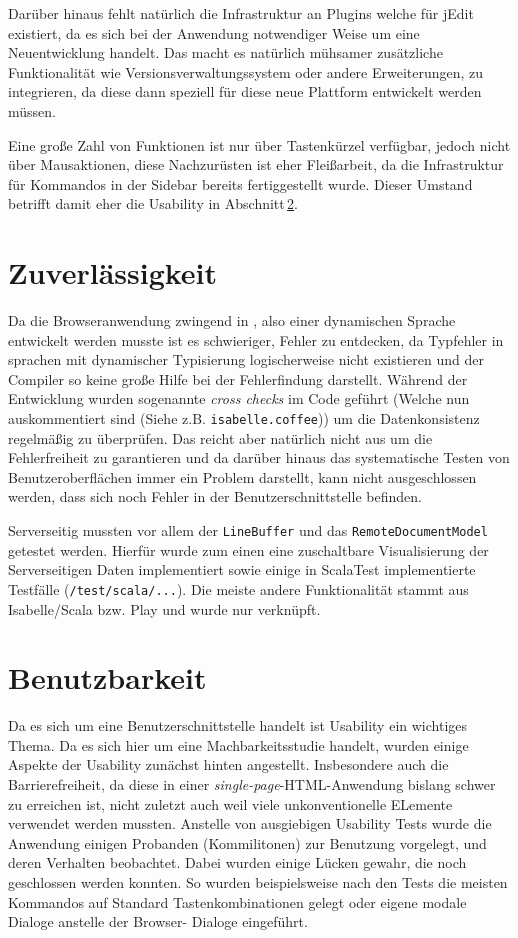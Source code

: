 Darüber hinaus fehlt natürlich die Infrastruktur an Plugins welche für jEdit existiert, da es sich
bei der Anwendung notwendiger Weise um eine Neuentwicklung handelt. Das macht es natürlich mühsamer
zusätzliche Funktionalität wie Versionsverwaltungssystem oder andere Erweiterungen, zu integrieren,
da diese dann speziell für diese neue Plattform entwickelt werden müssen.

Eine große Zahl von Funktionen ist nur über Tastenkürzel verfügbar, jedoch nicht über Mausaktionen,
diese Nachzurüsten ist eher Fleißarbeit, da die Infrastruktur für Kommandos in der Sidebar bereits
fertiggestellt wurde. Dieser Umstand betrifft damit eher die Usability in
Abschnitt\,\ref{sec:usability}.

\section{Zuverlässigkeit}

Da die Browseranwendung zwingend in , also einer dynamischen Sprache entwickelt werden
musste ist es schwieriger, Fehler zu entdecken, da Typfehler in sprachen mit dynamischer Typisierung
logischerweise nicht existieren und der Compiler so keine große Hilfe bei der Fehlerfindung
darstellt. Während der Entwicklung wurden sogenannte \textit{cross checks} im Code geführt (Welche
nun auskommentiert sind (Siehe z.B. \texttt{isabelle.coffee})) um die Datenkonsistenz regelmäßig zu
überprüfen. Das reicht aber natürlich nicht aus um die Fehlerfreiheit zu garantieren und da darüber
hinaus das systematische Testen von Benutzeroberflächen immer ein Problem darstellt, kann nicht
ausgeschlossen werden, dass sich noch Fehler in der Benutzerschnittstelle befinden.

Serverseitig mussten vor allem der \texttt{LineBuffer} und das \texttt{RemoteDocumentModel} getestet
werden. Hierfür wurde zum einen eine zuschaltbare Visualisierung der Serverseitigen Daten
implementiert sowie einige in ScalaTest implementierte Testfälle (\texttt{/test/scala/...}). Die
meiste andere Funktionalität stammt aus Isabelle/Scala bzw. Play und wurde nur verknüpft.

\section{Benutzbarkeit}
\label{sec:usability}

Da es sich um eine Benutzerschnittstelle handelt ist Usability ein wichtiges Thema. Da es sich hier
um eine Machbarkeitsstudie handelt, wurden einige Aspekte der Usability zunächst hinten angestellt.
Insbesondere auch die Barrierefreiheit, da diese in einer \textit{single-page}-HTML-Anwendung
bislang schwer zu erreichen ist, nicht zuletzt auch weil viele unkonventionelle ELemente verwendet
werden mussten. Anstelle von ausgiebigen Usability Tests wurde die Anwendung einigen Probanden
(Kommilitonen) zur Benutzung vorgelegt, und deren Verhalten beobachtet. Dabei wurden einige Lücken
gewahr, die noch geschlossen werden konnten. So wurden beispielsweise nach den Tests die meisten
Kommandos auf Standard Tastenkombinationen gelegt oder eigene modale Dialoge anstelle der Browser-
Dialoge eingeführt.

